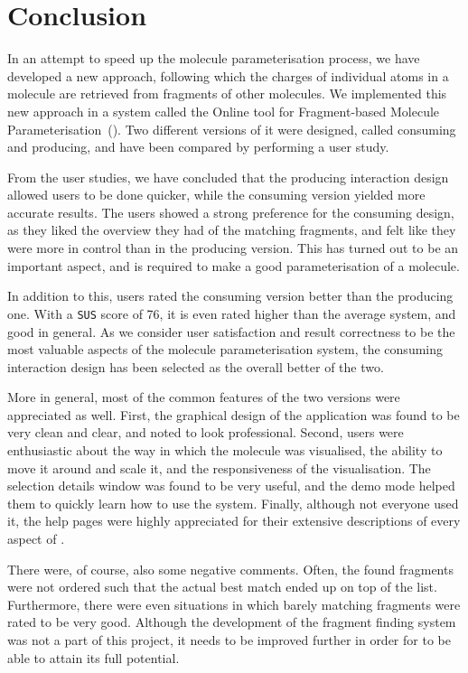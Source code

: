\chapter{Conclusion}

In an attempt to speed up the molecule parameterisation process, we have developed a new approach, following which the charges of individual atoms in a molecule are retrieved from fragments of other molecules. We implemented this new approach in a system called the Online tool for Fragment-based Molecule Parameterisation~(\oframp). Two different versions of it were designed, called consuming and producing, and have been compared by performing a user study.

From the user studies, we have concluded that the producing interaction design allowed users to be done quicker, while the consuming version yielded more accurate results. The users showed a strong preference for the consuming design, as they liked the overview they had of the matching fragments, and felt like they were more in control than in the producing version. This has turned out to be an important aspect, and is required to make a good parameterisation of a molecule.

In addition to this, users rated the consuming version better than the producing one. With a \verb|SUS| score of 76, it is even rated higher than the average system, and good in general. As we consider user satisfaction and result correctness to be the most valuable aspects of the molecule parameterisation system, the consuming interaction design has been selected as the overall better of the two.

More in general, most of the common features of the two versions were appreciated as well. First, the graphical design of the application was found to be very clean and clear, and noted to look professional. Second, users were enthusiastic about the way in which the molecule was visualised, the ability to move it around and scale it, and the responsiveness of the visualisation. The selection details window was found to be very useful, and the demo mode helped them to quickly learn how to use the system. Finally, although not everyone used it, the help pages were highly appreciated for their extensive descriptions of every aspect of \oframp.

There were, of course, also some negative comments. Often, the found fragments were not ordered such that the actual best match ended up on top of the list. Furthermore, there were even situations in which barely matching fragments were rated to be very good. Although the development of the fragment finding system was not a part of this project, it needs to be improved further in order for \oframp{} to be able to attain its full potential.


